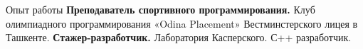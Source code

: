 \begin{rubric}{Опыт работы}
\entry*[2017 -- 2019]%
	\textbf{Преподаватель спортивного программирования.} Клуб олимпиадного программирования «Odina Placement» Вестминстерского лицея в Ташкенте. 
%
%
\entry*[2020 -- 2021]%
	\textbf{Стажер-разработчик.} Лаборатория Касперского. С++ разработчик.
%
\end{rubric}